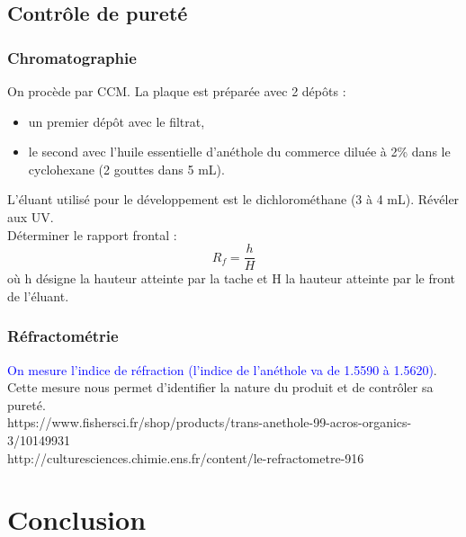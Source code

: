 \documentclass[11pt,a4paper]{report}
\begin{document}
\subsection{Contrôle de pureté}

\subsubsection*{Chromatographie}

On procède par CCM.
La plaque est préparée avec 2 dépôts :
\begin{itemize}
	\item un premier dépôt avec le filtrat,
	\item le second avec l'huile essentielle d'anéthole du commerce diluée 
	à 2\% dans le cyclohexane (2 gouttes dans 5 mL).
\end{itemize}

L'éluant utilisé pour le développement est le dichlorométhane (3 à 4 mL). Révéler aux UV.\\
 
Déterminer le rapport frontal :
\begin{equation}
	R_f = \frac{h}{H}
\end{equation}
où h désigne la hauteur atteinte par la tache et H la hauteur atteinte par le front de l'éluant. 

\subsubsection*{Réfractométrie}

\textcolor{blue}{On mesure l'indice de réfraction (l'indice de l'anéthole va de 1.5590 à 1.5620)}. Cette mesure nous permet d'identifier la nature du produit et de contrôler sa pureté.\\

https://www.fishersci.fr/shop/products/trans-anethole-99-acros-organics-3/10149931\\

http://culturesciences.chimie.ens.fr/content/le-refractometre-916

\section*{Conclusion}
\end{document}
